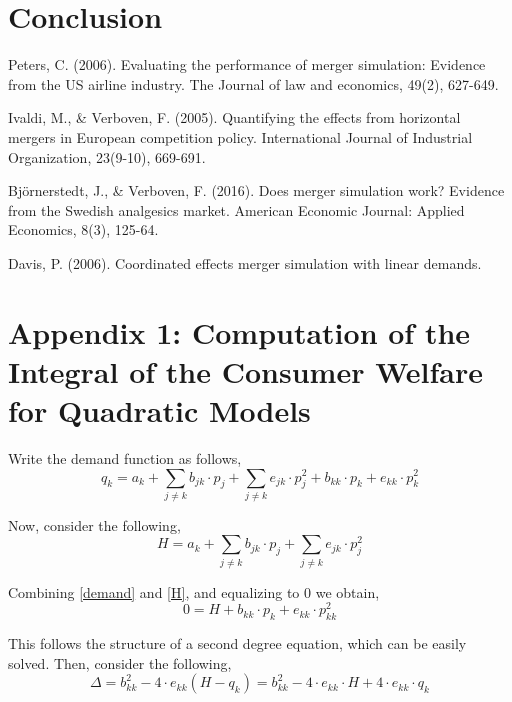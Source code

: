 \documentclass[12pt]{article}
\begin{document}
\section{Conclusion}

\newpage
\begin{thebibliography}{9}

Peters, C. (2006). Evaluating the performance of merger simulation: Evidence from the US airline industry. The Journal of law and economics, 49(2), 627-649.

Ivaldi, M., \& Verboven, F. (2005). Quantifying the effects from horizontal mergers in European competition policy. International Journal of Industrial Organization, 23(9-10), 669-691.

Bj\"{o}rnerstedt, J., \& Verboven, F. (2016). Does merger simulation work? Evidence from the Swedish analgesics market. American Economic Journal: Applied Economics, 8(3), 125-64.

Davis, P. (2006). Coordinated effects merger simulation with linear demands.
\end{thebibliography}


\newpage
\listoffigures

\newpage
\listoftables

\newpage
\section*{Appendix 1: Computation of the Integral of the Consumer Welfare for Quadratic Models}

Write the demand function as follows,
\begin{equation} \label{demand}
q_k = a_k + \sum_{j \neq k} b_{jk} \cdot p_j + \sum_{j \neq k} e_{jk} \cdot p_j^2 + b_{kk} \cdot p_k + e_{kk} \cdot p_k^2
\end{equation}

Now, consider the following,
\begin{equation} \label{H}
H = a_k + \sum_{j \neq k} b_{jk} \cdot p_j + \sum_{j \neq k} e_{jk} \cdot p_j^2
\end{equation}

Combining \ref{demand} and \ref{H}, and equalizing to $0$ we obtain,
\begin{equation*}
0 = H + b_{kk} \cdot p_k + e_{kk} \cdot p_{kk}^2
\end{equation*}

This follows the structure of a second degree equation, which can be easily solved. Then, consider the following,
\begin{equation*}
\Delta = b_{kk}^2 - 4 \cdot e_{kk} (H - q_k) = b_{kk}^2 - 4 \cdot e_{kk} \cdot H + 4 \cdot e_{kk} \cdot q_k 
\end{equation*}
\end{document}
